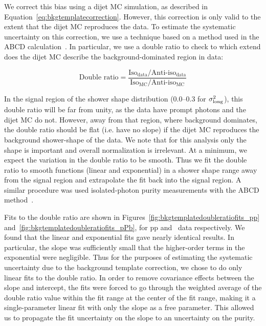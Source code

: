 We correct this bias using a dijet MC simulation, as described in Equation~\ref{eq:bkgtemplatecorrection}. However, this correction is only valid to the extent that the dijet MC reproduces the data. To estimate the systematic uncertainty on this correction, we use a technique based on a method used in the ABCD calculation~\cite{Erwann}. In particular, we use a double ratio to check to which extend does the dijet MC describe the background-dominated region in data: 

\begin{equation}
    \text{Double ratio} = \frac{\text{Iso}_{\text{data}}/\text{Anti-iso}_{\text{data}}}{\text{Iso}_{\text{MC}}/\text{Anti-iso}_{\text{MC}}}
    \label{eq:bkgtemplatedoubleratio}
\end{equation}

In the signal region of the shower shape distribution (0.0--0.3 for $\sigma^{2}_{\mathrm{long}}$), this double ratio will be far from unity, as the data have prompt photons and the dijet MC do not. However, away from that region, where background dominates, the double ratio should be flat (i.e. have no slope) if the dijet MC reproduces the background shower-shape of the data. We note that for this analysis only the shape is important and overall normalization is irrelevant. At a minimum, we expect the variation in the double ratio to be smooth. Thus we fit the double ratio to smooth functions (linear and exponential) in a shower shape range away from the signal region and extrapolate the fit back into the signal region. A similar procedure was used isolated-photon purity measurements with the ABCD method~\cite{Acharya:2019jkx,Erwann}.

Fits to the double ratio are shown in Figures~\ref{fig:bkgtemplatedoubleratiofits_pp} and~\ref{fig:bkgtemplatedoubleratiofits_pPb}, for pp and \pPb~data respectively. We found that the linear and exponential fits gave nearly identical results. In particular, the slope was sufficiently small that the higher-order terms in the exponential were negligible. Thus for the purposes of estimating the systematic uncertainty due to the background template correction, we chose to do only linear fits to the double ratio. In order to remove covariance effects between the slope and intercept, the fits were forced to go through the weighted average of the double ratio value within the fit range at the center of the fit range, making it a single-parameter linear fit with only the slope as a free parameter. This allowed us to propagate the fit uncertainty on the slope to an uncertainty on the purity.


